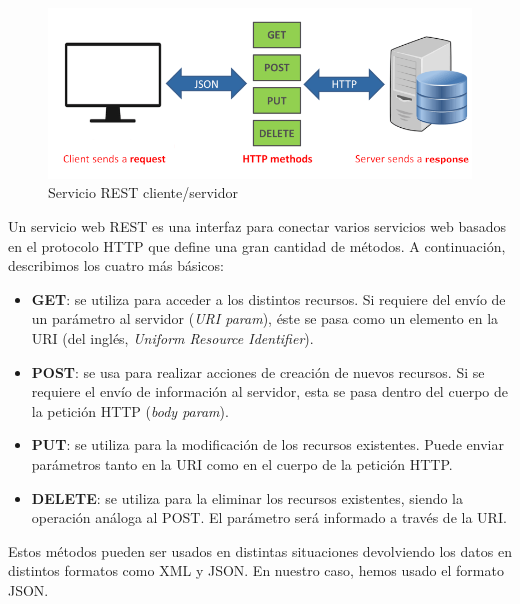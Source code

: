 \begin{figure}[h!]
	\centering
	
	
	\includegraphics[scale=0.4]{Imagenes/Figuras/rest_api}
	
	
	\caption{Servicio REST cliente/servidor}
	\label{fig:apiRest}
\end{figure}

Un servicio web REST es una interfaz para conectar varios servicios web basados en el protocolo HTTP que define una gran cantidad de métodos. A continuación, describimos los cuatro más básicos:
\begin{itemize}
	\item \textbf{GET}: se utiliza para acceder a los distintos recursos. Si requiere del envío de un parámetro al servidor (\textit{URI param}), éste se pasa como un elemento en la URI (del inglés, \textit{Uniform Resource Identifier}). 
	
	\item \textbf{POST}: se usa para realizar acciones de creación de nuevos recursos. Si se requiere el envío de información al servidor, esta se pasa dentro del cuerpo de la petición HTTP (\textit{body param}).
	
	\item \textbf{PUT}: se utiliza para la modificación de los recursos existentes. Puede enviar parámetros tanto en la URI como en el cuerpo de la petición HTTP.
	
	\item \textbf{DELETE}: se utiliza para la eliminar los recursos existentes, siendo la operación análoga al POST. El parámetro será informado a través de la URI.
\end{itemize}

Estos métodos pueden ser usados en distintas situaciones devolviendo los datos en distintos formatos como XML y JSON.
En nuestro caso, hemos usado el formato JSON.


